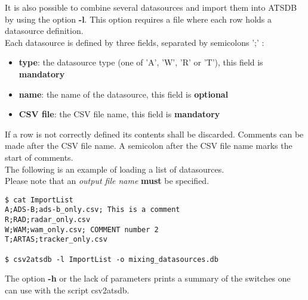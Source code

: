 It is also possible to combine several datasources and import them into ATSDB by using the option \textbf{-l}. This option requires a file where each row holds a datasource definition. \\

Each datasource is defined by three fields, separated by semicolons ';' :
\begin{itemize}
\item \textbf{type}: the datasource type (one of 'A', 'W', 'R' or 'T'), this field is \textbf{mandatory}
\item \textbf{name}: the name of the datasource, this field is \textbf{optional}
\item \textbf{CSV file}: the CSV file name, this field is \textbf{mandatory}
\\
\end{itemize}

If a row is not correctly defined its contents shall be discarded. Comments can be made after the CSV file name. A semicolon after the CSV file name marks the start of comments. \\

The following is an example of loading a list of datasources. \\
Please note that an \textit{output file name} \textbf{must} be specified.

\begin{verbatim}
$ cat ImportList
A;ADS-B;ads-b_only.csv; This is a comment
R;RAD;radar_only.csv
W;WAM;wam_only.csv; COMMENT number 2
T;ARTAS;tracker_only.csv

$ csv2atsdb -l ImportList -o mixing_datasources.db
\end{verbatim}

The option \textbf{-h} or the lack of parameters prints a summary of the switches one can use with the script csv2atsdb.


